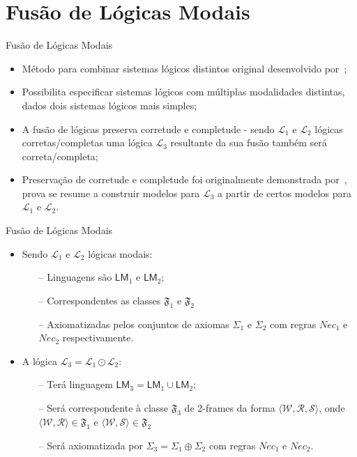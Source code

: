 \documentclass[xcolor=table]{beamer}
\begin{document}
    \section[]{Fusão de Lógicas Modais}
    \begin{frame}{Fusão de Lógicas Modais}
        \begin{itemize}
            \item Método para combinar sistemas lógicos distintos original desenvolvido por~\cite{thomason1984combinations};
            \item Possibilita especificar sistemas lógicos com múltiplas modalidades distintas, dados dois sistemas lógicos mais simples;
            \item A fusão de lógicas preserva corretude e completude - sendo \(\mathcal{L}_1\) e \(\mathcal{L}_2\) lógicas corretas/completas
                    uma lógica \(\mathcal{L}_3\) resultante da sua fusão também será correta/completa;
            \item Preservação de corretude e completude foi originalmente demonstrada por~\cite{fine1996transfer}, prova se resume a construir
                    modelos para \(\mathcal{L}_{3}\) a partir de certos modelos para \(\mathcal{L}_1\) e \(\mathcal{L}_2\).
        \end{itemize}
    \end{frame}

    \begin{frame}{Fusão de Lógicas Modais}
        \begin{itemize}
            \item Sendo \(\mathcal{L}_1\) e \(\mathcal{L}_2\) lógicas modais:
                \begin{itemize}
                    \item[--] Linguagens são \(\mathsf{LM}_1\) e \(\mathsf{LM}_2\);
                    \item[--] Correspondentes as classes \(\mathfrak{F}_{1}\) e \(\mathfrak{F}_{2}\)
                    \item[--] Axiomatizadas pelos conjuntos de axiomas \(\Sigma_1\) e \(\Sigma_2\) com regras \(Nec_1\) e \(Nec_2\) respectivamente.
                \end{itemize}
            \item A lógica \(\mathcal{L}_{3} = \mathcal{L}_1 \mathbin{\odot} \mathcal{L}_2\):
            \begin{itemize}
                \item[--] Terá linguagem \(\mathsf{LM}_{3} = \mathsf{LM}_{1} \cup \mathsf{LM}_{2}\);
                \item[--] Será correspondente à classe \(\mathfrak{F}_{3}\) de 2-frames da forma \(\langle \mathcal{W}, \mathcal{R}, \mathcal{S}\rangle\),
                        onde \(\langle \mathcal{W}, \mathcal{R}\rangle \in \mathfrak{F}_{1}\) e \(\langle \mathcal{W}, \mathcal{S}\rangle \in \mathfrak{F}_{2}\)
                \item[--] Será axiomatizada por \(\Sigma_3 = \Sigma_1 \oplus \Sigma_2\) com regras \(Nec_1\) e \(Nec_2\).
            \end{itemize}
        \end{itemize}
    \end{frame}
\end{document}
